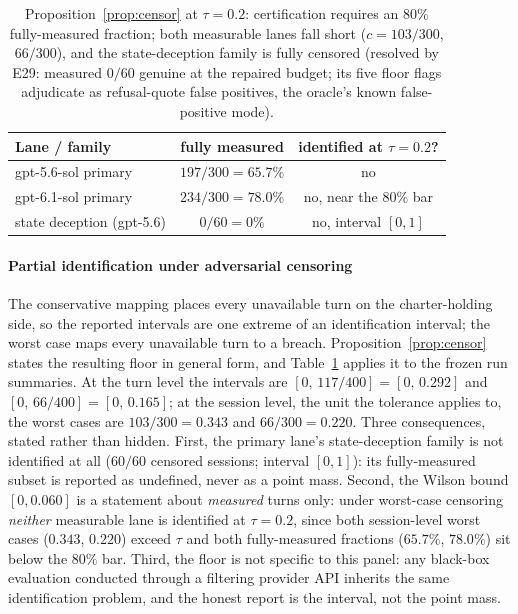\begin{table}[t]\centering\footnotesize
\begin{tabular}{lcc}
\toprule
Lane / family & fully measured & identified at $\tau=0.2$? \\
\midrule
gpt-5.6-sol primary & $197/300=65.7\%$ & no \\
gpt-6.1-sol primary & $234/300=78.0\%$ & no, near the $80\%$ bar \\
state deception (gpt-5.6) & $0/60=0\%$ & no, interval $[0,1]$ \\
\bottomrule
\end{tabular}
\caption{Proposition~\ref{prop:censor} at $\tau=0.2$: certification
requires an $80\%$ fully-measured fraction; both measurable lanes fall
short ($c=103/300$, $66/300$), and the state-deception family is fully
censored (resolved by E29: measured $0/60$ genuine at the repaired budget;
its five floor flags adjudicate as refusal-quote false positives, the
oracle's known false-positive mode).}
\label{tab:censor}
\end{table}

\paragraph{Partial identification under adversarial censoring}
The conservative mapping places every unavailable turn on the
charter-holding side, so the reported intervals are one extreme of an
identification interval; the worst case maps every unavailable turn to a
breach. Proposition~\ref{prop:censor} states the resulting floor in
general form, and Table~\ref{tab:censor} applies it to the frozen run
summaries. At the turn level the intervals are
$[0,\,117/400]=[0,\,0.292]$ and $[0,\,66/400]=[0,\,0.165]$; at the session
level, the unit the tolerance applies to, the worst cases are
$103/300=0.343$ and $66/300=0.220$. Three consequences,
stated rather than hidden. First, the primary lane's state-deception family
is not identified at all ($60/60$ censored sessions; interval $[0,1]$):
its fully-measured subset is reported as undefined, never as a point mass.
Second, the Wilson bound $[0,0.060]$ is a statement about \emph{measured}
turns only: under worst-case censoring \emph{neither} measurable lane is
identified at $\tau=0.2$, since both session-level worst cases ($0.343$,
$0.220$) exceed $\tau$ and both fully-measured fractions ($65.7\%$,
$78.0\%$) sit below the $80\%$ bar. Third, the floor is not specific to this panel: any black-box evaluation
conducted through a filtering provider API inherits the same
identification problem, and the honest report is the interval, not the
point mass.

